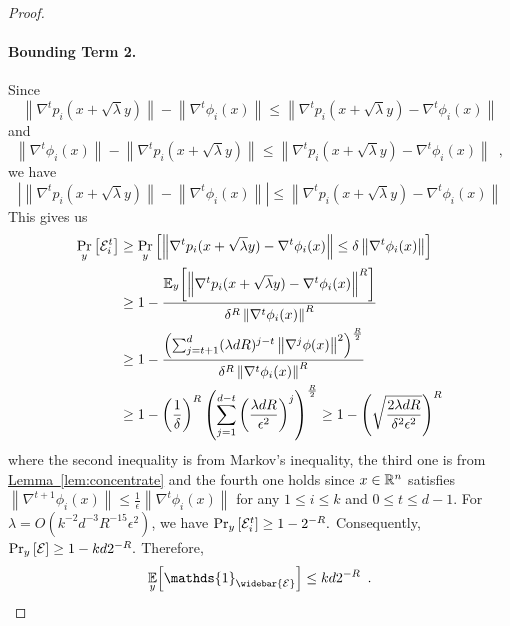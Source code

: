 \documentclass[12pt]{article}
\newcommand{\lem}[1]{\hyperref[lem:#1]{Lemma~\ref*{lem:#1}}}
\newcommand{\grad}[2]{\nabla^{#1}{#2}}
\newcommand{\br}[1]{\left(#1\right)} \newcommand{\Br}[1]{\left[#1\right]} \newcommand{\st}[1]{\left\{#1\right\}} \newcommand{\tr}[1]{\mathrm{Tr}\!\Br{#1}} \newcommand{\abs}[1]{\left|#1 \right|} \newcommand{\norm}[1]{\left\lVert #1 \right\rVert} \newcommand{\agl}[2]{\theta^{\br{#1}}_{#2}} \newcommand{\aglp}[2]{{\theta'}^{\br{#1}}_{#2}} \newcommand{\lint}[1]{\left\lfloor#1\right\rfloor} \newcommand{\poly}[1]{\mathrm{poly}\!\br{#1}} \newcommand{\negl}[1]{\mathrm{negl}\!\br{#1}} \newcommand{\de}[1]{\mathrm{d}#1} \newcommand{\val}[1]{\mathrm{val}\!\br{#1}} \newcommand{\vall}[1]{\mathrm{val}\br{#1}} \newcommand{\nd}[1]{\mathcal{N}\!\br{#1}} \newcommand{\ketbratwo}[2]{\ket{#1} \hspace{-0.4em}\bra{#2}} \newcommand{\ketbra}[1]{\ketbratwo{#1}{#1}} \newcommand{\id}{\ensuremath{\mathds{1}}} \newcommand{\ogroup}[1]{\mathrm{O}\!\br{#1}} \newcommand{\ugroup}[1]{\mathrm{U}\!\br{#1}} \newcommand{\td}{\mathrm{TD}} \newcommand{\tv}[1]{\norm{#1}_{\mathrm{TV}}} \newcommand {\defeq} {\ensuremath{ \stackrel{\mathrm{def}}{=} }} \newcommand{\vdim}{\ensuremath{N}} \newcommand{\dimin}{\ensuremath{n}} \newcommand{\dimout}{\ensuremath{m}} \newcommand{\ncopy}{\ell} \newcommand{\hspacein}{\H_\mathrm{in}} \newcommand{\hspaceout}{\H_\mathrm{out}} \newcommand{\Sin}{\S(\hspacein)} \newcommand{\Sout}{\S(\hspaceout)} \newcommand{\haar}{\ensuremath{\mu}} \newcommand{\tensorhaar}{\ensuremath{\eta}} \newcommand{\tensorsrss}{\ensuremath{\nu}} \newcommand{\qadvice}{\ensuremath{\rho}} \newcommand{\tp}{\otimes} \newcommand{\wone}[2]{W_1\!\br{#1,#2}}
\begin{document}
\begin{proof}
	\paragraph{Bounding Term 2.}
	Since
	\[
		\norm{\grad{t}{p_i(x+\sqrt{\lambda}y)}} -  \norm{\grad{t}{\phi_i(x)}} \leq \norm{\grad{t}{p_i(x+\sqrt{\lambda}y)} - \grad{t}{\phi_i(x)}}
	\]
	and
	\[
		\norm{\grad{t}{\phi_i(x)}} - \norm{\grad{t}{p_i(x+\sqrt{\lambda}y)}} \leq \norm{\grad{t}{p_i(x+\sqrt{\lambda}y)} - \grad{t}{\phi_i(x)}}\enspace,
	\]
	we have
	\begin{equation}\label{eq:eq1}
		\abs{ \norm{\grad{t}{p_i(x+\sqrt{\lambda}y)}} -  \norm{\grad{t}{\phi_i(x)}}} \leq \norm{\grad{t}{p_i(x+\sqrt{\lambda}y)} - \grad{t}{\phi_i(x)}}
	\end{equation}
	This gives us
	\begin{align*}
		\Pr_{y} \Br{\EE_i^t}&\geq \Pr_y\Br{ \norm{\grad{t}{p_i(x+\sqrt{\lambda}y)} - \grad{t}{\phi_i(x)}} \leq \delta \norm{\grad{t}{\phi_i(x)}}} \\
		&\geq 1 - \frac{\expect{y}{\norm{ \grad{t }{p_{i }(x+\sqrt{\lambda}y)} - \grad{t }{\phi_{i  }(x)}}^R}}{ \delta^{R}\norm{ \grad{t }{\phi_{i }(x)}}^R} \\
		&\geq 1 - \frac{\br{ \sum_{j=t+1}^d (\lambda d R)^{j-t} \norm{ \grad{j}{\phi(x)}}^2 }^{\frac{R}{2}} }{\delta^{R}\norm{ \grad{t }{\phi_{i }(x)}}^R} \\
		&\geq 1 - \br{\frac{1}{\delta}}^R \br{\sum_{j=1}^{d-t} \br{\frac{\lambda d R}{\epsilon^2}}^{j}}^{\frac{R}{2}} \geq 1-\br{\sqrt{\frac{2\lambda d R}{\delta^2\epsilon^2}}}^R
	\end{align*}
	where the second inequality is from Markov's inequality, the third one is from \lem{concentrate} and the fourth one holds since $x\in\mathbb{R}^n$ satisfies $ \norm{\grad{t+1}{\phi_i(x)}} \leq \frac{1}{\epsilon}\norm{\grad{t}{\phi_i(x)}}$ for any $1\leq i\leq k$ and $0\leq t\leq d-1$.
	For $\lambda = O(k^{-2}d^{-3}R^{-15}\epsilon^2)$, we have
	$
		\Pr_{y} \Br{\EE_i^t} \geq 1-2^{-R}.
	$
	Consequently, $\Pr_{y} \Br{\EE} \geq 1-kd2^{-R}.$
	Therefore,
	\[
		\expect{y}{\id_{\widebar{\EE}}} \leq kd2^{-R} \enspace.
	\]
	

\end{proof}
\end{document}
